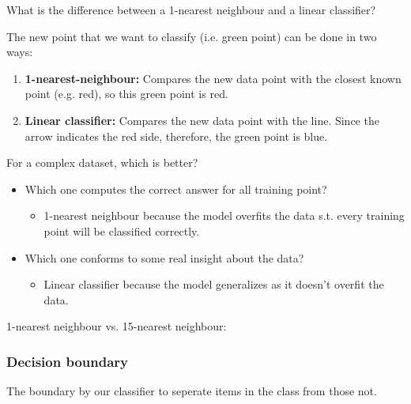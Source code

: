 \begin{example}
    What is the difference between a 1-nearest neighbour and a linear classifier?
    \vspace{1em}

    The new point that we want to classify (i.e. green point) can be done in two ways: 
    \begin{enumerate}
        \item \textbf{1-nearest-neighbour:} Compares the new data point with the closest known point (e.g. red), so this green point is red. 
        \item \textbf{Linear classifier:} Compares the new data point with the line. Since the arrow indicates the red side, therefore, the green point is blue. 
    \end{enumerate}

    For a complex dataset, which is better?
    \begin{itemize}
        \item Which one computes the correct answer for all training point?
        \begin{itemize}
            \item 1-nearest neighbour because the model overfits the data s.t. every training point will be classified correctly.
        \end{itemize}
        \item Which one conforms to some real insight about the data?
        \begin{itemize}
            \item Linear classifier because the model generalizes as it doesn't overfit the data.
        \end{itemize}
    \end{itemize}
\end{example}

\begin{example}
    1-nearest neighbour vs. 15-nearest neighbour:
\end{example}

    \subsubsection{Decision boundary}
    \begin{definition}
        The boundary by our classifier to seperate items in the class from those not. 
    \end{definition}

